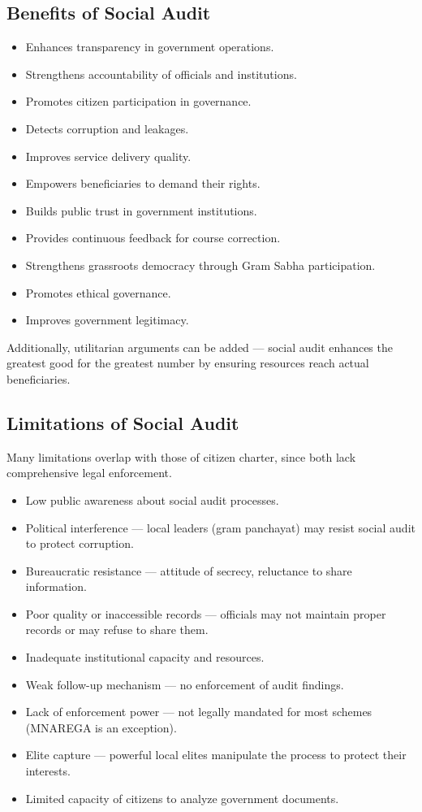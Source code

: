 \subsection{Benefits of Social Audit}
\begin{itemize}
\item Enhances transparency in government operations.
\item Strengthens accountability of officials and institutions.
\item Promotes citizen participation in governance.
\item Detects corruption and leakages.
\item Improves service delivery quality.
\item Empowers beneficiaries to demand their rights.
\item Builds public trust in government institutions.
\item Provides continuous feedback for course correction.
\item Strengthens grassroots democracy through Gram Sabha participation.
\item Promotes ethical governance.
\item Improves government legitimacy.
\end{itemize}
Additionally, utilitarian arguments can be added --- social audit enhances the greatest good for the greatest number by ensuring resources reach actual beneficiaries.

\subsection{Limitations of Social Audit}
Many limitations overlap with those of citizen charter, since both lack comprehensive legal enforcement.
\begin{itemize}
\item Low public awareness about social audit processes.
\item Political interference --- local leaders (gram panchayat) may resist social audit to protect corruption.
\item Bureaucratic resistance --- attitude of secrecy, reluctance to share information.
\item Poor quality or inaccessible records --- officials may not maintain proper records or may refuse to share them.
\item Inadequate institutional capacity and resources.
\item Weak follow-up mechanism --- no enforcement of audit findings.
\item Lack of enforcement power --- not legally mandated for most schemes (MNAREGA is an exception).
\item Elite capture --- powerful local elites manipulate the process to protect their interests.
\item Limited capacity of citizens to analyze government documents.
\end{itemize}

